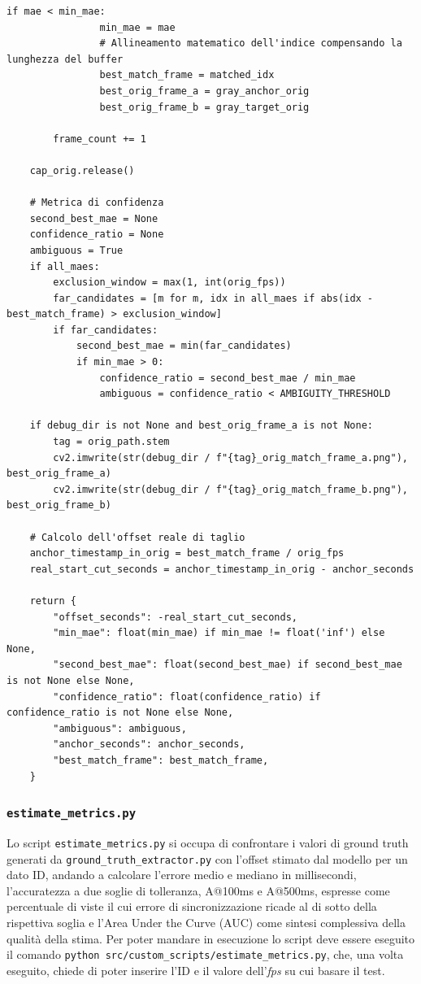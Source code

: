 \begin{lstlisting}[style=pythonstyle, caption={Estrazione del ground truth temporale tramite matching della dinamica}, label={lst:dynamic_between_two_frame}]
            if mae < min_mae:
                min_mae = mae
                # Allineamento matematico dell'indice compensando la lunghezza del buffer
                best_match_frame = matched_idx
                best_orig_frame_a = gray_anchor_orig
                best_orig_frame_b = gray_target_orig

        frame_count += 1

    cap_orig.release()

    # Metrica di confidenza
    second_best_mae = None
    confidence_ratio = None
    ambiguous = True
    if all_maes:
        exclusion_window = max(1, int(orig_fps)) 
        far_candidates = [m for m, idx in all_maes if abs(idx - best_match_frame) > exclusion_window]
        if far_candidates:
            second_best_mae = min(far_candidates)
            if min_mae > 0:
                confidence_ratio = second_best_mae / min_mae
                ambiguous = confidence_ratio < AMBIGUITY_THRESHOLD

    if debug_dir is not None and best_orig_frame_a is not None:
        tag = orig_path.stem
        cv2.imwrite(str(debug_dir / f"{tag}_orig_match_frame_a.png"), best_orig_frame_a)
        cv2.imwrite(str(debug_dir / f"{tag}_orig_match_frame_b.png"), best_orig_frame_b)

    # Calcolo dell'offset reale di taglio
    anchor_timestamp_in_orig = best_match_frame / orig_fps
    real_start_cut_seconds = anchor_timestamp_in_orig - anchor_seconds

    return {
        "offset_seconds": -real_start_cut_seconds,
        "min_mae": float(min_mae) if min_mae != float('inf') else None,
        "second_best_mae": float(second_best_mae) if second_best_mae is not None else None,
        "confidence_ratio": float(confidence_ratio) if confidence_ratio is not None else None,
        "ambiguous": ambiguous,
        "anchor_seconds": anchor_seconds,
        "best_match_frame": best_match_frame,
    }
\end{lstlisting}

\subsubsection{\texttt{estimate\_metrics.py}}
Lo script \texttt{estimate\_metrics.py} si occupa di confrontare i valori di ground truth generati da \texttt{ground\_truth\_extractor.py} con l'offset stimato dal modello per un dato ID, andando a calcolare l'errore medio e mediano in millisecondi, l'accuratezza a due soglie di tolleranza, A@100ms e A@500ms, espresse come percentuale di viste il cui errore di sincronizzazione ricade al di sotto della rispettiva soglia e l'Area Under the Curve (AUC) come sintesi complessiva della qualità della stima. Per poter mandare in esecuzione lo script deve essere eseguito il comando \texttt{python src/custom\_scripts/estimate\_metrics.py}, che, una volta eseguito, chiede di poter inserire l'ID e il valore dell'\textit{fps} su cui basare il test.

